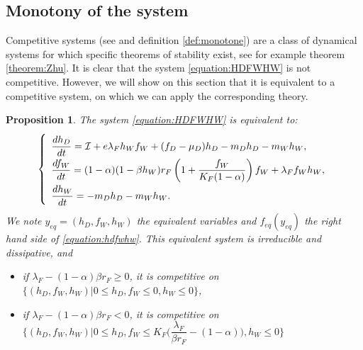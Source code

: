 \documentclass{article}
\newcommand{\lfw}{\lambda_{F}}
\newcommand{\lfw}{\lambda_{F}}
\newcommand{\cI}{\mathcal{I}}
\newtheorem{prop}{Proposition}
\begin{document}
\subsection{Monotony of the system}
Competitive systems (see \cite{smith_monotone_1995} and definition \ref{def:monotone}) are a class of dynamical systems for which specific theorems of stability exist, see for example theorem \ref{theorem:Zhu}. It is clear that the system \eqref{equation:HDFWHW} is not competitive. However, we will show on this section that it is equivalent to a competitive system, on which we can apply the corresponding theory.

\begin{prop} \label{prop: equivalentSystem}
The system \eqref{equation:HDFWHW} is equivalent to:
\begin{equation}
\def\arraystretch{2}
\left\{ \begin{array}{l}
\dfrac{dh_D}{dt}= \cI + e\lfw h_W f_W + (f_D - \mu_D) h_D - m_D h_D - m_W h_W, \\
\dfrac{df_W}{dt} = (1-\alpha)(1 - \beta h_W) r_F \left(1 + \dfrac{f_W}{K_F(1-\alpha)} \right) f_W + \lfw f_W h_W, \\
\dfrac{dh_W}{dt}= -m_D h_D - m_W h_W. 
\end{array} \right.
\label{equation:hdfwhw}
\end{equation}
We note $y_{eq} = (h_D, f_W, h_W)$ the equivalent variables and $f_{eq}(y_{eq})$ the right hand side of \eqref{equation:hdfwhw}. This equivalent system is irreducible and dissipative, and
\begin{itemize}
\item if $\lfw - (1-\alpha)\beta r_F \geq 0$, it is competitive on $\Big\{(h_D, f_W, h_W) | 0 \leq h_D, f_W  \leq 0, h_W \leq 0 \Big\}$,
\item if $\lfw - (1-\alpha)\beta r_F < 0$, it is competitive on $\Big\{(h_D, f_W, h_W) | 0 \leq h_D, f_W \leq K_F\big(\dfrac{\lfw}{\beta r_F}-(1-\alpha)\big), h_W \leq 0 \Big\}$ 
\end{itemize}

\end{prop}
\end{document}
